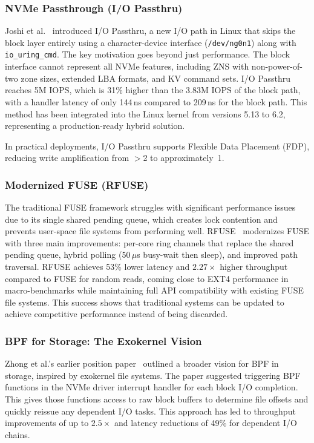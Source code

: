 \documentclass[conference]{IEEEtran}
\begin{document}
\subsubsection{NVMe Passthrough (I/O Passthru)}
\label{sec:passthru}

Joshi et al.~\cite{joshi2024iopassthru} introduced I/O Passthru, a new I/O path in Linux that skips the block layer entirely using a character-device interface (\texttt{/dev/ng0n1}) along with \texttt{io\_uring\_cmd}. The key motivation goes beyond just performance. The block interface cannot represent all NVMe features, including ZNS with non-power-of-two zone sizes, extended LBA formats, and KV command sets. I/O Passthru reaches 5M IOPS, which is 31\% higher than the 3.83M IOPS of the block path, with a handler latency of only 144\,ns compared to 209\,ns for the block path. This method has been integrated into the Linux kernel from versions 5.13 to 6.2, representing a production-ready hybrid solution.

In practical deployments, I/O Passthru supports Flexible Data Placement (FDP), reducing write amplification from $>$2 to approximately~1.

\subsubsection{Modernized FUSE (RFUSE)}
\label{sec:rfuse}

The traditional FUSE framework struggles with significant performance issues due to its single shared pending queue, which creates lock contention and prevents user-space file systems from performing well. RFUSE~\cite{rfuse2024} modernizes FUSE with three main improvements: per-core ring channels that replace the shared pending queue, hybrid polling (50\,$\mu$s busy-wait then sleep), and improved path traversal. RFUSE achieves 53\% lower latency and $2.27\times$ higher throughput compared to FUSE for random reads, coming close to EXT4 performance in macro-benchmarks while maintaining full API compatibility with existing FUSE file systems. This success shows that traditional systems can be updated to achieve competitive performance instead of being discarded.

\subsubsection{BPF for Storage: The Exokernel Vision}
\label{sec:bpf}

Zhong et al.'s earlier position paper~\cite{bpf2021storage} outlined a broader vision for BPF in storage, inspired by exokernel file systems. The paper suggested triggering BPF functions in the NVMe driver interrupt handler for each block I/O completion. This gives those functions access to raw block buffers to determine file offsets and quickly reissue any dependent I/O tasks. This approach has led to throughput improvements of up to $2.5\times$ and latency reductions of 49\% for dependent I/O chains.
\end{document}
